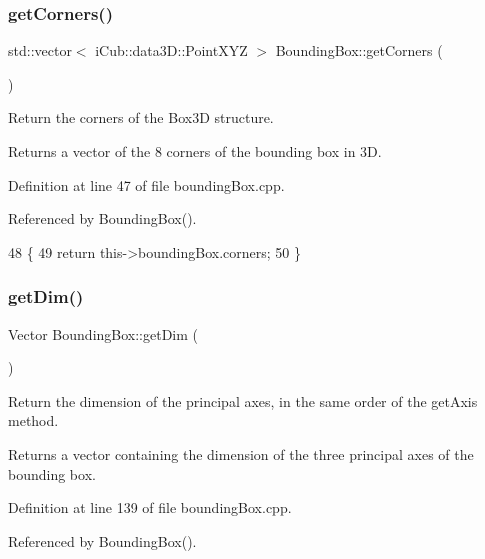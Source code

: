 \subsubsection{\texorpdfstring{get\+Corners()}{getCorners()}}
{\footnotesize\ttfamily std\+::vector$<$ i\+Cub\+::data3\+D\+::\+Point\+X\+YZ $>$ Bounding\+Box\+::get\+Corners (\begin{DoxyParamCaption}{ }\end{DoxyParamCaption})}



Return the corners of the Box3D structure. 

\begin{DoxyReturn}{Returns}
a vector of the 8 corners of the bounding box in 3D. 
\end{DoxyReturn}


Definition at line 47 of file bounding\+Box.\+cpp.



Referenced by Bounding\+Box().


\begin{DoxyCode}
48 \{
49     \textcolor{keywordflow}{return} this->boundingBox.corners;
50 \}
\end{DoxyCode}
\label{classiCub_1_1data3D_1_1BoundingBox_a96d06a9d784ac627078353814207ad68} 
\subsubsection{\texorpdfstring{get\+Dim()}{getDim()}}
{\footnotesize\ttfamily Vector Bounding\+Box\+::get\+Dim (\begin{DoxyParamCaption}{ }\end{DoxyParamCaption})}



Return the dimension of the principal axes, in the same order of the get\+Axis method. 

\begin{DoxyReturn}{Returns}
a vector containing the dimension of the three principal axes of the bounding box. 
\end{DoxyReturn}


Definition at line 139 of file bounding\+Box.\+cpp.



Referenced by Bounding\+Box().


